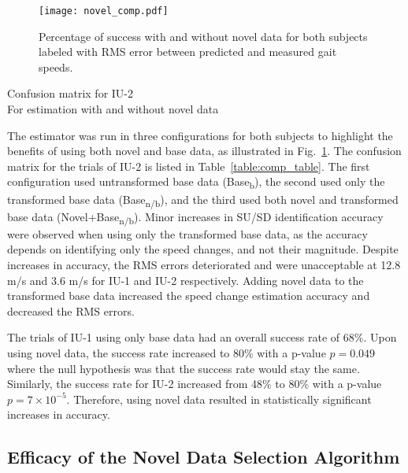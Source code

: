 \begin{figure}
	\centering
	\texttt{[image: novel\_comp.pdf]}
	\caption{Percentage of success with and without novel data for both subjects labeled with RMS error between predicted and measured gait speeds.}\label{fig:novel_comp}
\end{figure}

\begin{table}
	\centering
	\caption{Confusion matrix for IU-2 \\ For estimation with and without novel data }\label{table:comp_table}
	
\end{table}

The  estimator was run in three configurations for both subjects to highlight the benefits of using both novel and base data, as illustrated in Fig.~\ref{fig:novel_comp}. The confusion matrix for the trials of IU-2 is listed in Table~\ref{table:comp_table}. The first configuration used untransformed base data (Base\textsubscript{b}), the second used only the transformed base data (Base\textsubscript{n/b}), and the third used both novel and transformed base data (Novel+Base\textsubscript{n/b}). Minor increases in SU/SD identification accuracy were observed when using only the transformed base data, as the accuracy depends on identifying only the speed changes, and not their magnitude. Despite increases in accuracy, the RMS errors deteriorated and were unacceptable at 12.8 m/s and 3.6 m/s for IU-1 and IU-2 respectively. Adding novel data to the transformed base data increased the speed change estimation accuracy and decreased the RMS errors. 

The trials of IU-1 using only base data had an overall success rate of 68\%. Upon using novel data, the success rate increased to 80\% with a p-value $ p = 0.049$ where the null hypothesis was that the success rate would stay the same. Similarly, the success rate for IU-2 increased from 48\% to 80\% with a p-value $ p = 7\times10^{-5} $. Therefore, using novel data resulted in statistically significant increases in accuracy.

\subsection{Efficacy of the Novel Data Selection Algorithm}

